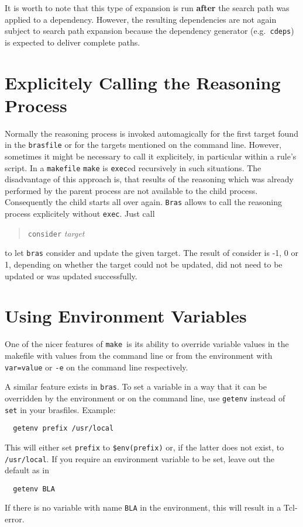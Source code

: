 \documentclass[12pt]{article}
\newcommand{\bras}{\texttt{bras}}
\newcommand{\Bras}{\texttt{Bras}}
\newcommand{\make}{\texttt{make}}
\newcommand{\brasfile}{\texttt{brasfile}}
\begin{document}
It is worth to note that this type of expansion is run \textbf{after}
the search path was applied to a dependency. However, the resulting
dependencies are not again subject to search path expansion because
the dependency generator (e.g.\ \texttt{cdeps}) is expected to deliver
complete paths.

\section{Explicitely Calling the Reasoning Process}
\label{secConsider}

Normally the reasoning process is invoked automagically for the first
target found in the \brasfile{} or for the targets mentioned on the
command line. However, sometimes it might be necessary to call it
explicitely, in particular within a rule's script. In a
\texttt{makefile} \make{} is \texttt{exec}ed recursively in such
situations. The disadvantage of this approach is, that results of
the reasoning which was already performed by the parent process are not
available to the child process. Consequently the child starts all over
again. \Bras{} allows to call the reasoning process explicitely
without \texttt{exec}. Just call

\begin{quote}
  \texttt{consider} \textit{target}
\end{quote}

to let \bras{} consider and update the given target. The result of
consider is -1, 0 or 1, depending on whether the target could not be
updated, did not need to be updated or was updated successfully.

\section{Using Environment Variables}
One of the nicer features of \make\ is its ability to override
variable values in the makefile with values from the command line or
from the environment with \texttt{var=value} or \texttt{-e}
on the command line respectively. 

A similar feature exists in \bras. To set a variable in a way that it
can be overridden by the environment or on the command line, use
\texttt{getenv} instead of \texttt{set} in your brasfiles. Example:
\begin{verbatim}
  getenv prefix /usr/local
\end{verbatim}
This will either set \texttt{prefix} to \texttt{\$env(prefix)} or, if
the latter does not exist, to \texttt{/usr/local}. If you require an
environment variable to be set, leave out the default as in
\begin{verbatim}
  getenv BLA
\end{verbatim}
If there is no variable with name
\texttt{BLA} in the environment, this will result in a Tcl-error.
\end{document}
